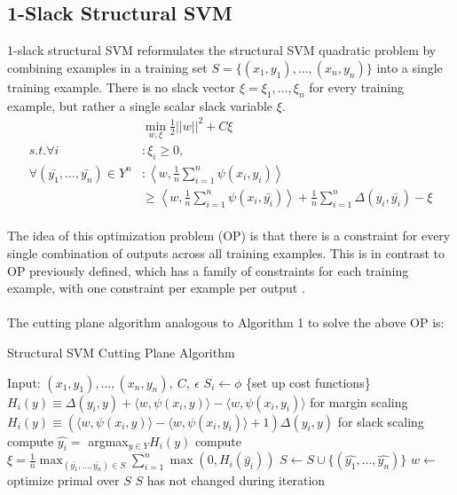 \subsection{1-Slack Structural SVM}
1-slack structural SVM reformulates the structural SVM quadratic problem by combining examples in a training set $S = \{(x_1, y_1), \ldots , (x_n, y_n)\}$ into a single training example. There is no slack vector $\xi = \xi _1, \ldots , \xi_n$ for every training example, but rather a single scalar slack variable $\xi$.
\begin{align}
&\min _{w, \xi} \frac{1}{2} ||w||^2 + C\xi \\
s.t. \forall i &: \xi _i \geq 0, \\
\forall (\bar{y_1}, \ldots, \bar{y_n}) \in Y^n &: \left \langle w, \frac{1}{n} \sum _{i=1} ^{n} \psi(x_i, y_i) \right\rangle \\
& \geq \left \langle w, \frac{1}{n} \sum _{i=1} ^{n} \psi(x_i, \bar{y_i}) \right\rangle + \frac{1}{n} \sum _{i=1} ^{n} \Delta(y_i, \bar{y_i}) - \xi
\end{align}
\\
The idea of this optimization problem (OP) is that there is a constraint for every single combination of outputs across all training examples. This is in contrast to OP previously defined, which has a family of constraints for each training example, with one constraint per example per output \cite{Finley2009}.
\\\\
\newpage
The cutting plane algorithm analogous to Algorithm 1 to solve the above OP is:
\begin{algorithm}
\caption{Structural SVM Cutting Plane Algorithm}
\begin{algorithmic}[1]
\State Input: $(x_1, y_1), \ldots, (x_n, y_n), \ C, \ \epsilon $
\State $ S_i \gets \phi$
	\State \{set up cost functions\}
	\State $H_i(y) \equiv \Delta(y_i, y) + \langle w, \psi (x_i, y) \rangle - \langle w, \psi (x_i, y_i) \rangle$ for margin scaling
	\State $H_i(y) \equiv (\langle w, \psi (x_i, y) \rangle - \langle w, \psi (x_i, y_i) \rangle + 1) \Delta(y_i, y)$ for slack scaling
\EndFor
\Repeat
		\State compute $\hat{y_i} = $ argmax$_{y \in Y} H_i(y)$
	\EndFor
	\State compute $\xi = \frac{1}{n} \max _{(\bar{y_1}, \ldots, \bar{y_n}) \in S} \sum _{i=1} ^ {n} \max(0, H_i(\bar{y_i}))$
		\State $S \gets S \cup \{(\hat{y_1}, \ldots, \hat{y_n})\}$
		\State $w \gets $ optimize primal over $S$
	\EndIf
\Until $S$ has not changed during iteration

\end{algorithmic}
\end{algorithm}